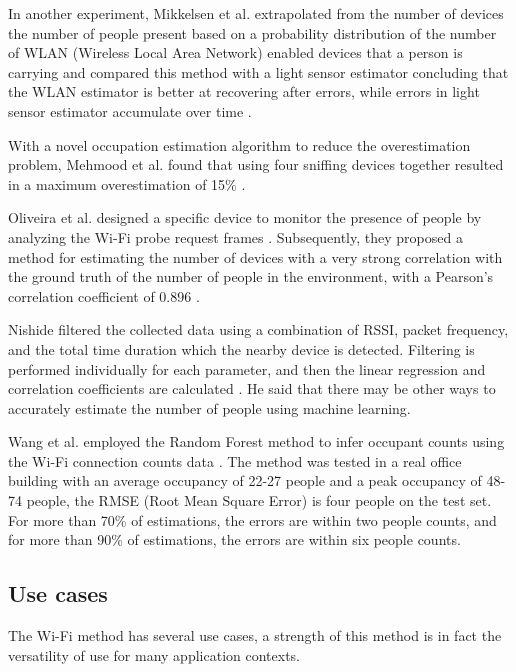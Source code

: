 In another experiment, Mikkelsen et al. extrapolated from the number of devices the number of people present based on a probability distribution of the number of WLAN (Wireless Local Area Network) enabled devices that a person is carrying and compared this method with a light sensor estimator concluding that the WLAN estimator is better at recovering after errors, while errors in light sensor estimator accumulate over time \cite{mikkelsen2018sensing}.

With a novel occupation estimation algorithm to reduce the overestimation problem, Mehmood et al. found that using four sniffing devices together resulted in a maximum overestimation of 15\% \cite{mehmood2019occupancy}.

Oliveira et al. designed a specific device to monitor the presence of people by analyzing the Wi-Fi probe request frames \cite{oliveira2018sherlock}. Subsequently, they proposed a method for estimating the number of devices with a very strong correlation with the ground truth of the number of people in the environment, with a Pearson's correlation coefficient of 0.896 \cite{oliveira2019mobile}.

Nishide filtered the collected data using a combination of RSSI, packet frequency, and the total time duration which the nearby device is detected. Filtering is performed individually for each parameter, and then the linear regression and correlation coefficients are calculated  \cite{nishide2019filter}. He said that there may be other ways to accurately estimate the number of people using machine learning.

Wang et al. employed the Random Forest method to infer occupant counts using the Wi-Fi connection counts data \cite{wang2019inferring}. The method was tested in a real office building with an average occupancy of 22-27 people and a peak occupancy of 48-74 people, the RMSE (Root Mean Square Error) is four people on the test set. For more than 70\% of estimations, the errors are within two people counts, and for more than 90\% of estimations, the errors are within six people counts. 


\vspace{0.1 cm}
\subsection{Use cases}
\label{sec:cases}
\vspace{0.1 cm}

The Wi-Fi method has several use cases, a strength of this method is in fact the versatility of use for many application contexts.

